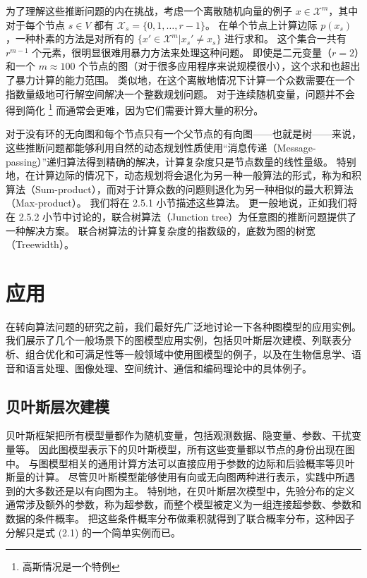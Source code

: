 为了理解这些推断问题的内在挑战，考虑一个离散随机向量的例子 $x \in \mathcal{X}^m$，其中对于每个节点 $s \in V$ 都有 $\mathcal{X}_s = \{0, 1, \dots, r-1\}$。
在单个节点上计算边际 $p(x_s)$，一种朴素的方法是对所有的 $\{x' \in \mathcal{X}^m|x_s' \neq x_s\}$ 进行求和。
这个集合一共有 $r^{m-1}$ 个元素，很明显很难用暴力方法来处理这种问题。
即使是二元变量（$r = 2$）和一个 $m \approx 100$ 个节点的图（对于很多应用程序来说规模很小），这个求和也超出了暴力计算的能力范围。
类似地，在这个离散地情况下计算一个众数需要在一个指数量级地可行解空间解决一个整数规划问题。
对于连续随机变量，问题并不会得到简化 \footnote{高斯情况是一个特例} 而通常会更难，因为它们需要计算大量的积分。

对于没有环的无向图和每个节点只有一个父节点的有向图——也就是树——来说，这些推断问题都能够利用自然的动态规划性质使用“消息传递（Message-passing）”递归算法得到精确的解决，计算复杂度只是节点数量的线性量级。
特别地，在计算边际的情况下，动态规划将会退化为另一种一般算法的形式，称为和积算法（Sum-product），而对于计算众数的问题则退化为另一种相似的最大积算法（Max-product）。
我们将在 2.5.1 小节描述这些算法。
更一般地说，正如我们将在 2.5.2 小节中讨论的，联合树算法（Junction tree）为任意图的推断问题提供了一种解决方案。
联合树算法的计算复杂度的指数级的，底数为图的树宽（Treewidth）。

\section{应用}

在转向算法问题的研究之前，我们最好先广泛地讨论一下各种图模型的应用实例。
我们展示了几个一般场景下的图模型应用实例，包括贝叶斯层次建模、列联表分析、组合优化和可满足性等一般领域中使用图模型的例子，以及在生物信息学、语音和语言处理、图像处理、空间统计、通信和编码理论中的具体例子。

\subsection{贝叶斯层次建模}

贝叶斯框架把所有模型量都作为随机变量，包括观测数据、隐变量、参数、干扰变量等。
因此图模型表示下的贝叶斯模型，所有这些变量都以节点的身份出现在图中。
与图模型相关的通用计算方法可以直接应用于参数的边际和后验概率等贝叶斯量的计算。
尽管贝叶斯模型能够使用有向或无向图两种进行表示，实践中所遇到的大多数还是以有向图为主。
特别地，在贝叶斯层次模型中，先验分布的定义通常涉及额外的参数，称为超参数，而整个模型被定义为一组连接超参数、参数和数据的条件概率。
把这些条件概率分布做乘积就得到了联合概率分布，这种因子分解只是式 (2.1) 的一个简单实例而已。

